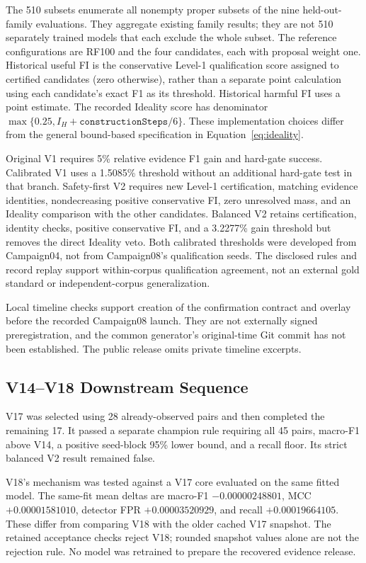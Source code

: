 \documentclass[manuscript,screen,nonacm]{acmart}
\begin{document}
The 510 subsets enumerate all nonempty proper subsets of the nine
held-out-family evaluations. They aggregate existing family results;
they are not 510 separately trained models that each exclude the whole
subset. The reference configurations are RF100 and the four candidates,
each with proposal weight one. Historical useful FI is the conservative
Level-1 qualification score assigned to certified candidates (zero
otherwise), rather than a separate point calculation using each candidate's
exact F1 as its threshold. Historical harmful FI uses a point estimate.
The recorded Ideality score has denominator
$\max\{0.25,I_H+\texttt{constructionSteps}/6\}$.
These implementation choices differ from the general bound-based
specification in Equation~\ref{eq:ideality}.

Original V1 requires 5\% relative evidence F1 gain and hard-gate success.
Calibrated V1 uses a 1.5085\% threshold without an additional hard-gate
test in that branch. Safety-first V2 requires new Level-1 certification,
matching evidence identities, nondecreasing positive conservative FI,
zero unresolved mass, and an Ideality comparison with the other candidates.
Balanced V2 retains certification, identity checks, positive conservative
FI, and a 3.2277\% gain threshold but removes the direct Ideality veto.
Both calibrated thresholds were developed from Campaign04, not from
Campaign08's qualification seeds. The disclosed rules and record replay
support within-corpus qualification agreement, not an external gold standard
or independent-corpus generalization.

Local timeline checks support creation of the confirmation contract and
overlay before the recorded Campaign08 launch. They are not externally
signed preregistration, and the common generator's original-time Git commit
has not been established. The public release omits private timeline excerpts.

\subsection{V14--V18 Downstream Sequence}

V17 was selected using 28 already-observed pairs and then completed the
remaining 17. It passed a separate champion rule requiring all 45 pairs,
macro-F1 above V14, a positive seed-block 95\% lower bound, and a recall
floor. Its strict balanced V2 result remained false.

V18's mechanism was tested against a V17 core evaluated on the same fitted
model. The same-fit mean deltas are macro-F1 $-0.00000248801$, MCC
$+0.00001581010$, detector FPR $+0.00003520929$, and recall
$+0.00019664105$. These differ from comparing V18 with the older cached
V17 snapshot. The retained acceptance checks reject V18; rounded snapshot
values alone are not the rejection rule. No model was retrained to prepare
the recovered evidence release.
\end{document}
